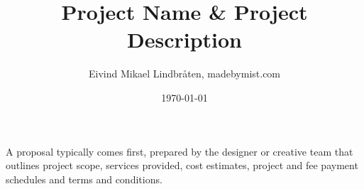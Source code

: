 \documentclass{mist-proposal}
\begin{document}
\title{Project Name \& Project Description}
\date{\today{}}
\author{Eivind Mikael Lindbråten, madebymist.com}

\maketitle{}

A proposal typically comes first, prepared by the designer or creative team that outlines project scope, services provided, cost estimates, project and fee payment schedules and terms and conditions.

%
%



% 
% 
% 
% 
\end{document}
